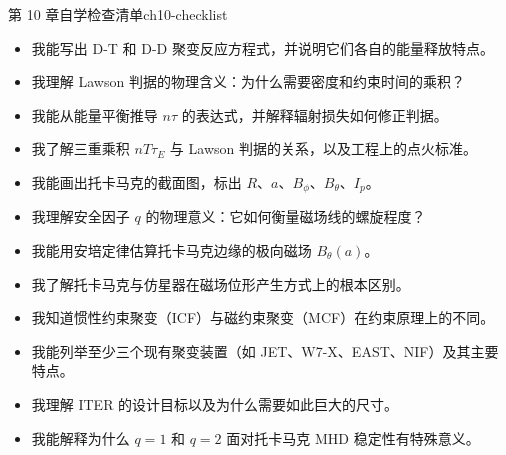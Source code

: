 \begin{checklistbox}{第 10 章自学检查清单}{ch10-checklist}
\begin{itemize}[leftmargin=*,label=$\square$]
\item[$\square$] 我能写出 D-T 和 D-D 聚变反应方程式，并说明它们各自的能量释放特点。
\item[$\square$] 我理解 Lawson 判据的物理含义：为什么需要密度和约束时间的乘积？
\item[$\square$] 我能从能量平衡推导 $n\tau$ 的表达式，并解释辐射损失如何修正判据。
\item[$\square$] 我了解三重乘积 $nT\tau_E$ 与 Lawson 判据的关系，以及工程上的点火标准。
\item[$\square$] 我能画出托卡马克的截面图，标出 $R$、$a$、$B_{\phi}$、$B_{\theta}$、$I_p$。
\item[$\square$] 我理解安全因子 $q$ 的物理意义：它如何衡量磁场线的螺旋程度？
\item[$\square$] 我能用安培定律估算托卡马克边缘的极向磁场 $B_{\theta}(a)$。
\item[$\square$] 我了解托卡马克与仿星器在磁场位形产生方式上的根本区别。
\item[$\square$] 我知道惯性约束聚变（ICF）与磁约束聚变（MCF）在约束原理上的不同。
\item[$\square$] 我能列举至少三个现有聚变装置（如 JET、W7-X、EAST、NIF）及其主要特点。
\item[$\square$] 我理解 ITER 的设计目标以及为什么需要如此巨大的尺寸。
\item[$\square$] 我能解释为什么 $q=1$ 和 $q=2$ 面对托卡马克 MHD 稳定性有特殊意义。
\end{itemize}
\end{checklistbox}


\endinput
